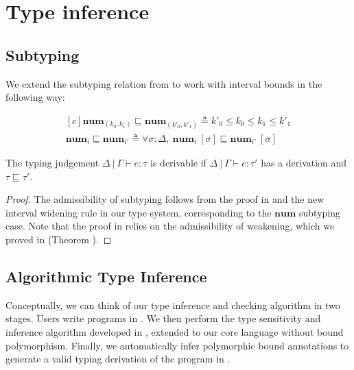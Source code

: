 \section{Type inference}

\subsection{Subtyping}
We extend the subtyping relation from \cite{NumFuzz} to work with interval
bounds in the following way:

$$
\begin{aligned}[c]
\textbf{num}_{(k_0, k_1)} \sqsubseteq \textbf{num}_{(k'_0, k'_1)} \triangleq 
k'_0 \leq k_0 \leq k_1 \leq k'_1 \\
\textbf{num}_{i} \sqsubseteq \textbf{num}_{i'} \triangleq 
\forall \sigma : \Delta, \
\textbf{num}_{i}~[\sigma] \sqsubseteq \textbf{num}_{i'}~[\sigma]
\end{aligned}
$$

\begin{theorem}
  The typing judgement $\Delta \ | \ \Gamma \vdash e : \tau$ is derivable if
  $\Delta \ | \ \Gamma \vdash e : \tau'$ has a derivation and $\tau \sqsubseteq
  \tau'$.
\end{theorem}
\begin{proof}
  The admissibility of subtyping follows from the proof in \cite{NumFuzz} and
  the new interval widening rule in our type system, corresponding to the
  $\textbf{num}$ subtyping case. Note that the proof in \cite{NumFuzz} relies on
  the admissibility of weakening, which we proved in (Theorem
  \cite{thm:weakening}).
\end{proof}

\subsection{Algorithmic Type Inference}

Conceptually, we can think of our type inference and checking algorithm in two
stages. Users write programs in \Lang. We then perform the type sensitivity and
inference algorithm developed in \cite{NumFuzz}, extended to our core language
without bound polymorphism. Finally, we automatically infer polymorphic bound
annotations to generate a valid typing derivation of the program in \bnd{\Lang}.

